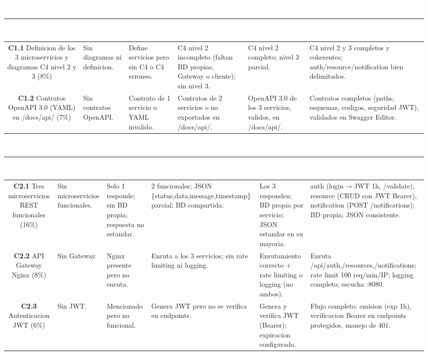 \documentclass[10pt]{article}
\newcommand{\cab}[1]{\textcolor{white}{\textbf{#1}}}
\newcommand{\dimtitulo}[1]{%
\vspace{4pt}\begin{tcolorbox}[colback=azulMedio,colframe=azulMedio,boxrule=0pt,arc=1pt,left=6pt,right=6pt,top=3pt,bottom=3pt]
\textcolor{white}{\textbf{#1}}\end{tcolorbox}\vspace{-2pt}}
\begin{document}
\dimtitulo{D1. Diseno de la arquitectura (15\%)}
\noindent\begin{tabularx}{\textwidth}{C *{5}{Y}}
\toprule
{} \cab{Criterio (peso)} & \cab{Nivel 0 -- Ausente} & \cab{Nivel 1} & \cab{Nivel 2} & \cab{Nivel 3} & \cab{Nivel 4} \\ \midrule
\textbf{C1.1} Definicion de los 3 microservicios y diagramas C4 nivel 2 y 3 (8\%) & Sin diagramas ni definicion. & Define servicios pero sin C4 o C4 erroneo. & C4 nivel 2 incompleto (faltan BD propias, Gateway o cliente); sin nivel 3. & C4 nivel 2 completo; nivel 3 parcial. & C4 nivel 2 y 3 completos y coherentes; auth/resource/notification bien delimitados. \\
\textbf{C1.2} Contratos OpenAPI 3.0 (YAML) en /docs/api/ (7\%) & Sin contratos OpenAPI. & Contrato de 1 servicio o YAML invalido. & Contratos de 2 servicios o no exportados en /docs/api/. & OpenAPI 3.0 de los 3 servicios, validos, en /docs/api/. & Contratos completos (paths, esquemas, codigos, seguridad JWT), validados en Swagger Editor. \\
\bottomrule
\end{tabularx}

\dimtitulo{D2. Microservicios REST, API Gateway y autenticacion JWT (30\%)}
\noindent\begin{tabularx}{\textwidth}{C *{5}{Y}}
\toprule
{} \cab{Criterio (peso)} & \cab{Nivel 0 -- Ausente} & \cab{Nivel 1} & \cab{Nivel 2} & \cab{Nivel 3} & \cab{Nivel 4} \\ \midrule
\textbf{C2.1} Tres microservicios REST funcionales (16\%) & Sin microservicios funcionales. & Solo 1 responde; sin BD propia; respuesta no estandar. & 2 funcionales; JSON \{status,data,message,timestamp\} parcial; BD compartida. & Los 3 responden; BD propia por servicio; JSON estandar en su mayoria. & auth (login$\to$JWT 1h, /validate), resource (CRUD con JWT Bearer), notification (POST /notifications); BD propia; JSON consistente. \\
\textbf{C2.2} API Gateway Nginx (8\%) & Sin Gateway. & Nginx presente pero no enruta. & Enruta a los 3 servicios; sin rate limiting ni logging. & Enrutamiento correcto + rate limiting o logging (no ambos). & Enruta /api/auth,/resources,/notifications; rate limit 100 req/min/IP; logging completo; escucha :8080. \\
\textbf{C2.3} Autenticacion JWT (6\%) & Sin JWT. & Mencionado pero no funcional. & Genera JWT pero no se verifica en endpoints. & Genera y verifica JWT (Bearer); expiracion configurada. & Flujo completo: emision (exp 1h), verificacion Bearer en endpoints protegidos, manejo de 401. \\
\bottomrule
\end{tabularx}
\end{document}
